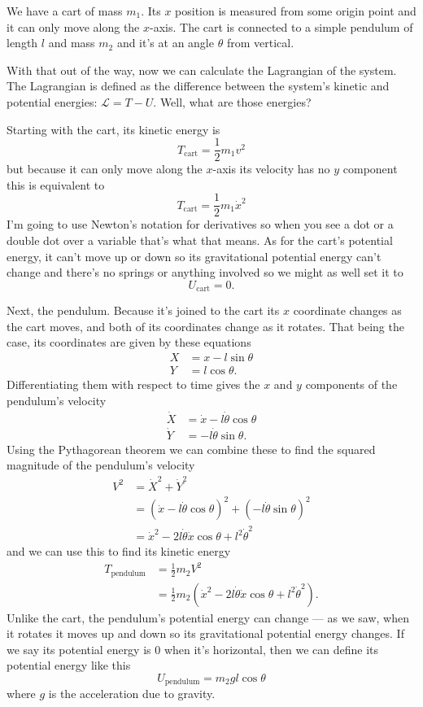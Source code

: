\documentclass{article}
\begin{document}
We have a cart of mass $m_1$. Its $x$ position is measured from some origin point and it can only move along the $x$-axis. The cart is connected to a simple pendulum of length $l$ and mass $m_2$ and it's at an angle $\theta$ from vertical.

With that out of the way, now we can calculate the Lagrangian of the system. The Lagrangian is defined as the difference between the system's kinetic and potential energies: $\mathcal{L} = T - U$. Well, what are those energies?

Starting with the cart, its kinetic energy is \[T_\text{cart} = \frac{1}{2} m_1 v^2\] but because it can only move along the $x$-axis its velocity has no $y$ component this is equivalent to \[T_\text{cart} = \frac{1}{2} m_1 \dot{x}^2\] I'm going to use Newton's notation for derivatives so when you see a dot or a double dot over a variable that's what that means. As for the cart's potential energy, it can't move up or down so its gravitational potential energy can't change and there's no springs or anything involved so we might as well set it to \[U_\text{cart} = 0.\]

Next, the pendulum. Because it's joined to the cart its $x$ coordinate changes as the cart moves, and both of its coordinates change as it rotates. That being the case, its coordinates are given by these equations \begin{align*}
  X & = x - l \sin \theta \\
  Y & = l \cos \theta.
\end{align*} Differentiating them with respect to time gives the $x$ and $y$ components of the pendulum's velocity \begin{align*}
  \dot{X} & = \dot{x} - l \dot{\theta} \cos \theta \\
  \dot{Y} & = -l \dot{\theta} \sin \theta.
\end{align*} Using the Pythagorean theorem we can combine these to find the squared magnitude of the pendulum's velocity \begin{align*}
  V^2 & = \dot{X}^2 + \dot{Y}^2                                                      \\
      & = (\dot{x} - l \dot{\theta} \cos \theta)^2 + (-l \dot{\theta} \sin \theta)^2 \\
      & = \dot{x}^2 - 2 l \dot{\theta} \dot{x} \cos \theta + l^2 \dot{\theta}^2
\end{align*}
and we can use this to find its kinetic energy \begin{align*}
T_\text{pendulum} & = \frac{1}{2} m_2 V^2                                                                          \\
                    & = \frac{1}{2} m_2 (\dot{x}^2 - 2 l \dot{\theta} \dot{x} \cos \theta + l^2 \dot{\theta}^2).
\end{align*} Unlike the cart, the pendulum's potential energy can change — as we saw, when it rotates it moves up and down so its gravitational potential energy changes. If we say its potential energy is $0$ when it's horizontal, then we can define its potential energy like this \[U_\text{pendulum} = m_2 g l \cos \theta\] where $g$ is the acceleration due to gravity.
\end{document}
